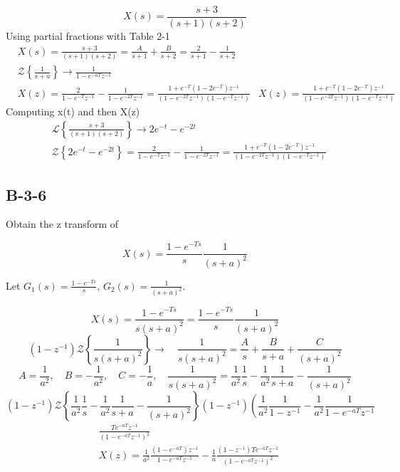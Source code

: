 \[
X(s)= \frac{s+3}{(s+1)(s+2)}
\]
Using partial fractions with Table 2-1
	\begin{align*}
	& X(s) = \frac{s+3}{(s+1)(s+2)}= \frac{A}{s+1}+\frac{B}{s+2} = \frac{2}{s+1}-\frac{1}{s+2} \\
	& \mathcal{Z} \left\{\frac{1}{s+a}\right\} \rightarrow \frac{1}{1-e^{-aT}z^{-1}} \\
	& X(z) = \frac{2}{1-e^{-T}z^{-1}} - \frac{1}{1-e^{-2T}z^{-1}} = 
	\frac{1+e^{-T}(1-2e^{-T})z^{-1}}{(1-e^{-2T}z^{-1})(1-e^{-T}z^{-1})}
	& X(z) = \frac{1+e^{-T}(1-2e^{-T})z^{-1}}{(1-e^{-2T}z^{-1})(1-e^{-T}z^{-1})}
	\end{align*}
Computing x(t) and then X(z)
	\begin{align*}
	& \mathcal{L} \left\{ \frac{s+3}{(s+1)(s+2)}\right\} \rightarrow 2e^{-t}-e^{-2t}\\
	& \mathcal{Z} \left\{2e^{-t}-e^{-2t}\right\}= \frac{2}{1-e^{-T}z^{-1}}-\frac{1}{1-e^{-2T}z^{-1}}=\frac{1+e^{-T}(1-2e^{-T})z^{-1}}{(1-e^{-2T}z^{-1})(1-e^{-T}z^{-1})}
	\end{align*}
\subsection*{B-3-6}



        \begin{par}
Obtain the z transform of
\end{par} \vspace{1em}
\begin{par}
$$X(s)=\frac{1-e^{-Ts}}{s}\frac{1}{(s+a)^2}$$
\end{par} %

Let $G_1(s) = \frac{1-e^{-Ts}}{s}$, $G_2(s)=\frac{1}{(s+a)^2}$.

\[ X(s)= \frac{1-e^{-Ts}}{s(s+a)^2}=\frac{1-e^{-Ts}}{s}\frac{1}{(s+a)^2} \]
\[ (1-z^{-1})\mathcal{Z}\left\{\frac{1}{s(s+a)^2} \right\} \rightarrow  \quad \frac{1}{s(s+a)^2} = \frac{A}{s} + \frac{B}{s+a} + \frac{C}{(s+a)^2} \]
\[ A = \frac{1}{a^2}, \quad B = -\frac{1}{a^2}, \quad C= -\frac{1}{a}, \quad \frac{1}{s(s+a)^2}=\frac{1}{a^2}\frac{1}{s} - \frac{1}{a^2}\frac{1}{s+a}-\frac{1}{(s+a)^2}\]
\[ (1-z^{-1})\mathcal{Z}\left\{ \frac{1}{a^2}\frac{1}{s} - \frac{1}{a^2}\frac{1}{s+a}-\frac{1}{(s+a)^2} \right\} (1-z^{-1})\left(\frac{1}{a^2}\frac{1}{1-z^{-1}}-\frac{1}{a^2}\frac{1}{1-e^{-aT}z^{-1}} \right.
\]
\begin{align*}
& \frac{Te^{-aT}z^{-1}}{(1-e^{-aT}z^{-1})^2} \\
& X(z)=\frac{1}{a^2}\frac{(1-e^{-aT})z^{-1}}{1-e^{-aT}z^{-1}}-
\frac{1}{a}\frac{(1-z^{-1})Te^{-aT}z^{-1}}{(1-e^{-aT}z^{-1})^2}
\end{align*}

